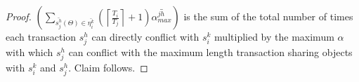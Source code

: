 \documentclass[prodmode,acmtecs]{acmsmall}
\begin{document}
\begin{proof}
$\left(\sum_{\bar{s_{j}^{h}}(\Theta) \in \bar{\eta_{i}^{k}}}\left(\left\lceil \frac{T_{i}}{T_{j}}\right\rceil +1\right)\bar{\alpha_{max}^{jh}}\right)$ is the sum of the total number of times each transaction $s_j^h$ can directly conflict with $s_i^k$ multiplied by the maximum $\alpha$ with which $s_j^h$ can conflict with the maximum length transaction sharing objects with $s_i^k$ and $s_j^h$. 
Claim follows.
\end{proof}





\received{}{}{}


\medskip
\end{document}

